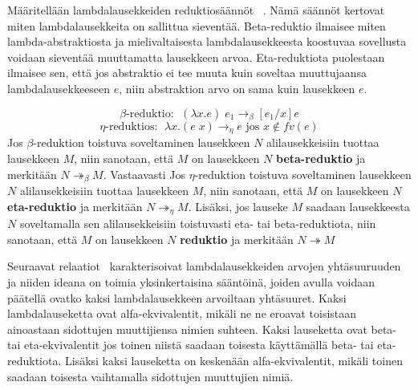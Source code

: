 \par

Määritellään lambdalausekkeiden reduktiosäännöt ~\cite[s.~9]{Hudak89}. Nämä säännöt kertovat miten lambdalausekkeita on sallittua sieventää. Beta-reduktio ilmaisee miten lambda-abstraktiosta ja mielivaltaisesta lambdalausekkeesta koostuvaa sovellusta voidaan sieventää muuttamatta lausekkeen arvoa. Eta-reduktiota puolestaan ilmaisee sen, että jos abstraktio ei tee muuta kuin soveltaa muuttujaansa lambdalausekkeeseen $e$, niin abstraktion arvo on sama kuin lausekkeen $e$.     

\begin{maar}[reduktiosäännöt]	
\[\beta \text{-reduktio: } \; (\lambda x.e )\; e_{1} \rightarrow_{\beta} [e_{1} / x]e \]
\[\eta \text{-reduktios: } \; \lambda x.(e \; x) \rightarrow_{\eta} e \text{ jos } x \notin fv(e) \]	
Jos $\beta$-reduktion toistuva soveltaminen lausekkeen $N$ alilausekkeisiin tuottaa lausekkeen $M$, niin sanotaan, että $M$ on lausekkeen $N$ \textbf{beta-reduktio} ja merkitään $N  \twoheadrightarrow_{\beta} M$. Vastaavasti Jos $\eta$-reduktion toistuva soveltaminen lausekkeen $N$ alilausekkeisiin tuottaa lausekkeen $M$, niin sanotaan, että $M$ on lausekkeen $N$ \textbf{eta-reduktio} ja merkitään $N  \twoheadrightarrow_{\eta} M$. Lisäksi, jos lauseke $M$ saadaan lausekkeesta $N$ soveltamalla sen alilausekkeisiin toistuvasti eta- tai beta-reduktiota, niin sanotaan, että $M$ on lausekkeen $N$ \textbf{reduktio} ja merkitään $N  \twoheadrightarrow M$        
\end{maar}

\par

%

Seuraavat relaatiot~\cite[s.~23--24]{HBEB2000} karakterisoivat lambdalausekkeiden arvojen yhtäsuuruuden ja niiden ideana on toimia yksinkertaisina sääntöinä, joiden avulla voidaan päätellä ovatko kaksi lambdalausekkeen arvoiltaan yhtäsuuret. Kaksi lambdalauseketta ovat alfa-ekvivalentit, mikäli ne ne eroavat toisistaan ainoastaan sidottujen muuttijiensa nimien suhteen. Kaksi lauseketta ovat beta- tai eta-ekvivalentit jos toinen niistä saadaan toisesta käyttämällä beta- tai eta-reduktiota. Lisäksi kaksi lauseketta on keskenään alfa-ekvivalentit, mikäli toinen saadaan toisesta vaihtamalla sidottujen muuttujien nimiä.


